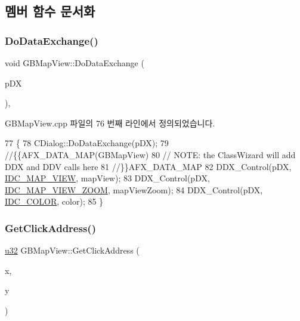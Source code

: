 \subsection{멤버 함수 문서화}
\mbox{\label{class_g_b_map_view_a8d268ce36e59f20ebabe08aa9dbed9f0}} 
\subsubsection{\texorpdfstring{Do\+Data\+Exchange()}{DoDataExchange()}}
{\footnotesize\ttfamily void G\+B\+Map\+View\+::\+Do\+Data\+Exchange (\begin{DoxyParamCaption}\item[{C\+Data\+Exchange $\ast$}]{p\+DX }\end{DoxyParamCaption})\hspace{0.3cm}{\ttfamily [protected]}, {\ttfamily [virtual]}}



G\+B\+Map\+View.\+cpp 파일의 76 번째 라인에서 정의되었습니다.


\begin{DoxyCode}
77 \{
78   CDialog::DoDataExchange(pDX);
79   \textcolor{comment}{//\{\{AFX\_DATA\_MAP(GBMapView)}
80   \textcolor{comment}{// NOTE: the ClassWizard will add DDX and DDV calls here}
81   \textcolor{comment}{//\}\}AFX\_DATA\_MAP}
82   DDX\_Control(pDX, \mbox{\hyperlink{resource_8h_a3e6bb424d55ccf9fed6fa557eba35488}{IDC\_MAP\_VIEW}}, mapView);
83   DDX\_Control(pDX, \mbox{\hyperlink{resource_8h_a623597a58dcab206815a2c2fc7de0d91}{IDC\_MAP\_VIEW\_ZOOM}}, mapViewZoom);
84   DDX\_Control(pDX, \mbox{\hyperlink{resource_8h_a611975b03b6d7ce68b2de260b97086d0}{IDC\_COLOR}}, color);
85 \}
\end{DoxyCode}
\mbox{\label{class_g_b_map_view_a8071362b1d60245c02266c3d48d51495}} 
\subsubsection{\texorpdfstring{Get\+Click\+Address()}{GetClickAddress()}}
{\footnotesize\ttfamily \mbox{\hyperlink{_system_8h_a10e94b422ef0c20dcdec20d31a1f5049}{u32}} G\+B\+Map\+View\+::\+Get\+Click\+Address (\begin{DoxyParamCaption}\item[{\mbox{\hyperlink{_util_8cpp_a0ef32aa8672df19503a49fab2d0c8071}{int}}}]{x,  }\item[{\mbox{\hyperlink{_util_8cpp_a0ef32aa8672df19503a49fab2d0c8071}{int}}}]{y }\end{DoxyParamCaption})}



